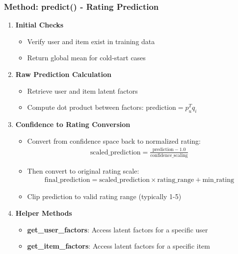 \documentclass{beamer}
\begin{document}
\begin{frame}
\frametitle{Method: predict() - Rating Prediction}

\begin{enumerate}
    \item \textbf{Initial Checks}
    \begin{itemize}
        \item Verify user and item exist in training data
        \item Return global mean for cold-start cases
    \end{itemize}
    
    \item \textbf{Raw Prediction Calculation}
    \begin{itemize}
        \item Retrieve user and item latent factors
        \item Compute dot product between factors: $\text{prediction} = p_u^T q_i$
    \end{itemize}
    
    \item \textbf{Confidence to Rating Conversion}
    \begin{itemize}
        \item Convert from confidence space back to normalized rating:
        \begin{align*}
        \text{scaled\_prediction} = \frac{\text{prediction} - 1.0}{\text{confidence\_scaling}}
        \end{align*}
        \item Then convert to original rating scale:
        \begin{align*}
        \text{final\_prediction} = \text{scaled\_prediction} \times \text{rating\_range} + \text{min\_rating}
        \end{align*}
        \item Clip prediction to valid rating range (typically 1-5)
    \end{itemize}
    
    \item \textbf{Helper Methods}
    \begin{itemize}
        \item \textbf{get\_user\_factors}: Access latent factors for a specific user
        \item \textbf{get\_item\_factors}: Access latent factors for a specific item
    \end{itemize}
\end{enumerate}
\end{frame}
\end{document}
